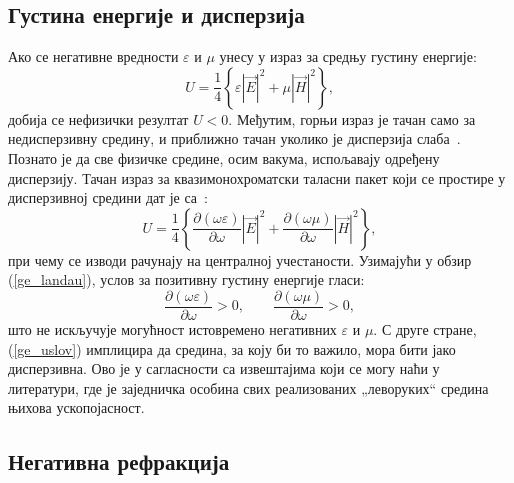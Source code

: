 \documentclass[main.tex]{subfiles}
\begin{document}


\subsection{Густина енергије и дисперзија}%
\label{sub:gustina_energije_i_disperzija}

Ако се негативне вредности $\varepsilon$ и $\mu$ унесу у израз за средњу густину енергије:
\begin{equation}
    U = \frac{1}{4}\left\{ \varepsilon |\vec{E}|^2 + \mu |\vec{H}|^2 \right\},
\end{equation}
добија се нефизички резултат $U<0$. Међутим, горњи израз је тачан само за недисперзивну средину, и приближно тачан уколико је дисперзија слаба~\cite{markes_knjiga}. Познато је да све физичке средине, осим вакума, испољавају одређену дисперзију. Тачан израз за квазимонохроматски таласни пакет који се простире у дисперзивној средини дат је са~\cite{landau1982}:
\begin{equation}\label{ge_landau}
    U = \frac{1}{4}\left\{ \frac{\partial (\omega\varepsilon)}{\partial\omega}|\vec{E}|^2 + \frac{\partial (\omega\mu)}{\partial\omega}|\vec{H}|^2 \right\},
\end{equation}
при чему се изводи рачунају на централној учестаности. Узимајући у обзир (\ref{ge_landau}), услов за позитивну густину енергије гласи:
\begin{equation}\label{ge_uslov}
    \frac{\partial (\omega\varepsilon)}{\partial\omega} > 0, \qquad \frac{\partial (\omega\mu)}{\partial\omega} > 0,
\end{equation}
што не искључује могућност истовремено негативних $\varepsilon$ и $\mu$. С друге стране, (\ref{ge_uslov}) имплицира да средина, за коју би то важило, мора бити јако дисперзивна. Ово је у сагласности са извештајима који се могу наћи у литератури, где је заједничка особина свих реализованих „леворуких`` средина њихова ускопојасност.
\subsection{Негативна рефракција}
\end{document}
